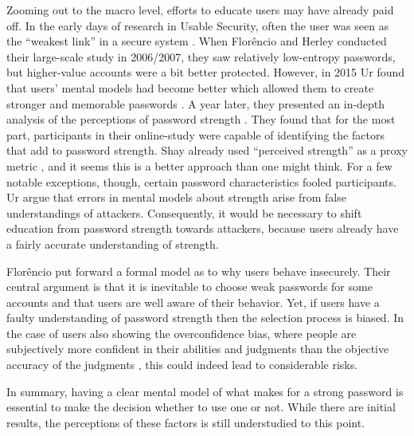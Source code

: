 Zooming out to the macro level, efforts to educate users may have already paid off. In the early days of research in Usable Security, often the user was seen as the ``weakest link'' in a secure system \cite{Adams1997MakingPWsSecureAndUsable, Sasse2005UsableSecurityPosition}. When Florêncio and Herley conducted their large-scale study in 2006/2007, they saw relatively low-entropy passwords, but higher-value accounts were a bit better protected. However, in 2015 Ur \etal found that users' mental models had become better which allowed them to create stronger and memorable passwords \cite{Ur2015PWCreationLab}. A year later, they presented an in-depth analysis of the perceptions of password strength \cite{Ur2016PerceptionsPassword}. They found that for the most part, participants in their online-study were capable of identifying the factors that add to password strength. Shay \etal already used ``perceived strength'' as a proxy metric \cite{Shay2015SpoonfulOfSugar}, and it seems this is a better approach than one might think. For a few notable exceptions, though, certain password characteristics fooled participants. Ur \etal argue that errors in mental models about strength arise from false understandings of attackers. Consequently, it would be necessary to shift education from password strength towards attackers, because users already have a fairly accurate understanding of strength. 

Florêncio \etal put forward a formal model as to why users behave insecurely. Their central argument is that it is inevitable to choose weak passwords for some accounts and that users are well aware of their behavior. Yet, if users have a faulty understanding of password strength then the selection process is biased. In the case of users also showing the overconfidence bias, where people are subjectively more confident in their abilities and judgments than the objective accuracy of the judgments \cite{Simonson1989ChoiceBasedOnReasons}, this could indeed lead to considerable risks.  %

In summary, having a clear mental model of what makes for a strong password is essential to make the decision whether to use one or not. While there are initial results, the perceptions of these factors is still understudied to this point.

